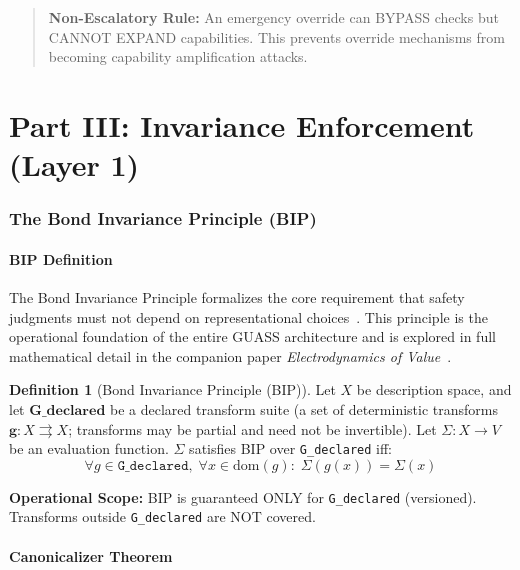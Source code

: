 \documentclass[11pt,letterpaper]{article}
\theoremstyle{definition}
\newtheorem{definition}[theorem]{Definition}
\theoremstyle{remark}
\begin{document}
\begin{quote}
\textbf{Non-Escalatory Rule:} An emergency override can BYPASS checks but CANNOT EXPAND capabilities. This prevents override mechanisms from becoming capability amplification attacks.
\end{quote}



\part*{Part III: Invariance Enforcement (Layer 1)}

\section{The Bond Invariance Principle (BIP)}

\subsection{BIP Definition}

The Bond Invariance Principle formalizes the core requirement that safety judgments must not depend on representational choices~\cite{bond2025bip}. This principle is the operational foundation of the entire GUASS architecture and is explored in full mathematical detail in the companion paper \emph{Electrodynamics of Value}~\cite{bond2025eov}.

\begin{definition}[Bond Invariance Principle (BIP)]
\label{def:bip}
Let $X$ be description space, and let $\mathbf{G\_declared}$ be a declared transform suite (a set of deterministic transforms $\mathbf{g}: X \rightrightarrows X$; transforms may be partial and need not be invertible). Let $\Sigma: X \to V$ be an evaluation function. $\Sigma$ satisfies BIP over \texttt{G\_declared} iff:
\[
\forall g \in \texttt{G\_declared},\; \forall x \in \mathrm{dom}(g):\; \Sigma(g(x)) = \Sigma(x)
\]
\end{definition}

\textbf{Operational Scope:} BIP is guaranteed ONLY for \texttt{G\_declared} (versioned). Transforms outside \texttt{G\_declared} are NOT covered.

\subsection{Canonicalizer Theorem}
\end{document}
